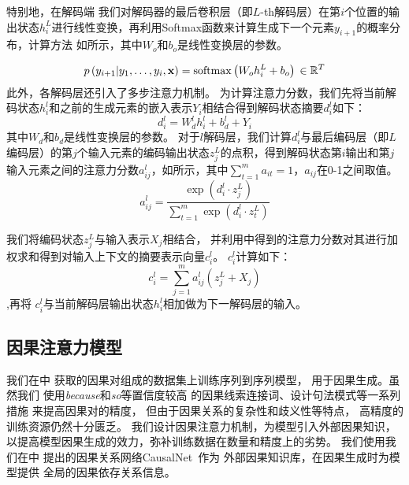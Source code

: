 特别地，在解码端
我们对解码器的最后卷积层（即$L$-th解码层）在第$i$个位置的输出状态$h_{i}^{L}$进行线性变换，再利用Softmax函数来计算生成下一个元素$y_{i+1}$的概率分布，计算方法
如所示，其中$W _ { o }$和$b_ { o }$是线性变换层的参数。

\begin{equation}
\label{eq:causalgen-prob}
p \left( y _ { i + 1 } | y _ { 1 } , \ldots , y _ { i } , \mathbf { x } \right) = 
\operatorname { softmax } \left( W _ { o } h _ { i } ^ { L } + b _ { o } \right) \\ 
\in \mathbb { R } ^ { T }
\end{equation}
此外，各解码层还引入了多步注意力机制。
为计算注意力分数，我们先将当前解码状态$h^l_{i}$和之前的生成元素的嵌入表示$Y_i$相结合得到解码状态摘要$d _ { i } ^ { l }$如下：
\begin{equation}
d _ { i } ^ { l } = W _ { d } ^ { l } h _ { i } ^ { l } + b _ { d } ^ { l } + Y _ { i }
\end{equation}
其中$W _ { d }$和$b_ { d }$是线性变换层的参数。
对于$l$解码层，我们计算$d _ { i } ^ { l }$与最后编码层（即$L$编码层）的第$j$个输入元素的编码输出状态$z^L_j$的点积，得到解码状态第$i$输出和第$j$输入元素之间的注意力分数$a^l_{ij}$，如所示，其中$\sum_{ t = 1 }^{m}a_{it} = 1$，$a _ { i j }$在0-1之间取值。
\begin{equation}
\label{eq:causalgen-attn-a}
a _ { i j } ^ { l } = \frac { \exp \left( d _ { i } ^ { l } \cdot z _ { j } ^ { L } \right) } { \sum _ { t = 1 } ^ { m } \exp \left( d _ { i } ^ { l } \cdot z _ { t } ^ { L } \right) }
\end{equation}

我们将编码状态$z_j^L$与输入表示$X_j$相结合，
并利用中得到的注意力分数对其进行加权求和得到对输入上下文的摘要表示向量$c _ { i } ^ { l }$。
$c _ { i } ^ { l }$计算如下：
\begin{equation}
\label{eq:causalgen-attn-c}
c _ { i } ^ { l } = \sum _ { j = 1 } ^ { m } a _ { i j } ^ { l } \left( z _ { j } ^ { L } + X_j \right)
\end{equation}
,再将 $c _ { i } ^ { l }$与当前解码层输出状态$h_{i}^{l}$相加做为下一解码层的输入。

\subsection{因果注意力模型}
\label{sec:causalgen-causal-attention}
我们在中
获取的因果对组成的数据集上训练序列到序列模型，
用于因果生成。虽然我们
使用\emph{because}和\emph{so}等置信度较高
的因果线索连接词、设计句法模式等一系列措施
来提高因果对的精度，
但由于因果关系的复杂性和歧义性等特点，
高精度的训练资源仍然十分匮乏。
我们设计因果注意力机制，为模型引入外部因果知识，以提高模型因果生成的效力，弥补训练数据在数量和精度上的劣势。
我们使用我们在中
提出的因果关系网络CausalNet~\cite{luo2016commonsense}作为
外部因果知识库，在因果生成时为模型提供
全局的因果依存关系信息。

